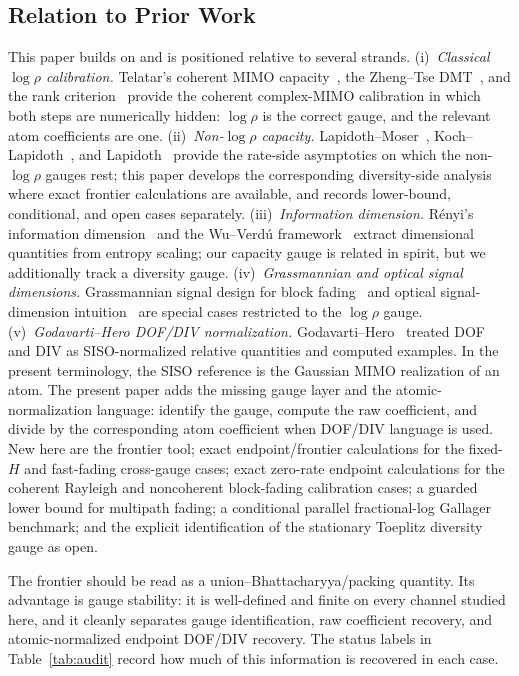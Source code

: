 \documentclass[lettersize,onecolumn]{IEEEtran}
\newcommand{\snr}{\rho}
\begin{document}
\subsection{Relation to Prior Work}

This paper builds on and is positioned relative to several strands.
(i)~\emph{Classical $\log\snr$ calibration.}
Telatar's coherent MIMO capacity~\cite{Telatar1999}, the Zheng--Tse
DMT~\cite{ZhengTse2003}, and the rank
criterion~\cite{TarokhSeshadriCalderbank1998} provide the coherent
complex-MIMO calibration in which both steps are numerically hidden:
$\log\snr$ is the correct gauge, and the relevant atom coefficients
are one.
(ii)~\emph{Non-$\log\snr$ capacity.}
Lapidoth--Moser~\cite{LapidothMoser2003},
Koch--Lapidoth~\cite{KochLapidoth2009}, and
Lapidoth~\cite{Lapidoth2005} provide the rate-side asymptotics on
which the non-$\log\snr$ gauges rest; this paper develops the
corresponding diversity-side analysis where exact frontier
calculations are available, and records lower-bound, conditional,
and open cases separately.
(iii)~\emph{Information dimension.}
R\'enyi's information dimension~\cite{Renyi1959} and the
Wu--Verd\'u framework~\cite{WuVerdu2010,WuShamaiVerdu2015} extract
dimensional quantities from entropy scaling; our capacity gauge is
related in spirit, but we additionally track a diversity gauge.
(iv)~\emph{Grassmannian and optical signal dimensions.}
Grassmannian signal design for block
fading~\cite{ZhengTse2002} and optical signal-dimension
intuition~\cite{PiestunMiller2000,Miller2000} are special cases
restricted to the $\log\snr$ gauge.
(v)~\emph{Godavarti--Hero DOF/DIV normalization.}
Godavarti--Hero~\cite{GodavartiHero2002} treated DOF and DIV as
SISO-normalized relative quantities and computed examples. In the
present terminology, the SISO reference is the Gaussian MIMO
realization of an atom. The present paper adds the missing
gauge layer and the atomic-normalization language: identify the
gauge, compute the raw coefficient, and
divide by the corresponding atom coefficient when DOF/DIV language
is used. New here are the frontier tool; exact
endpoint/frontier calculations for the fixed-$H$ and fast-fading
cross-gauge cases; exact zero-rate endpoint calculations for the
coherent Rayleigh and noncoherent block-fading calibration cases;
a guarded lower bound for multipath fading; a conditional parallel
fractional-log Gallager benchmark; and the explicit identification
of the stationary Toeplitz diversity gauge as open.

The frontier should be read as a
union--Bhattacharyya/packing quantity. Its advantage is gauge
stability: it is well-defined and finite on every channel studied
here, and it cleanly separates gauge identification, raw coefficient
recovery, and atomic-normalized endpoint DOF/DIV recovery. The status
labels in Table~\ref{tab:audit} record how much of this information
is recovered in each case.
\end{document}
